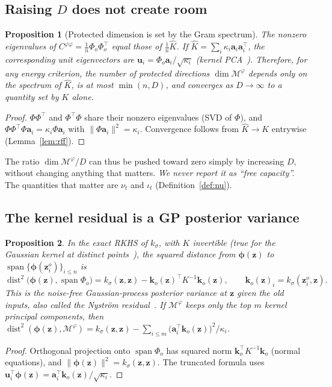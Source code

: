 \documentclass[11pt]{article}
\theoremstyle{plain}
\newtheorem{proposition}{Proposition}
\theoremstyle{definition}
\theoremstyle{remark}
\newcommand{\M}{\mathcal{M}}
\newcommand{\spn}{\operatorname{span}}
\newcommand{\dist}{\operatorname{dist}}
\newcommand{\z}{\bm{z}}
\newcommand{\vu}{\bm{u}}
\newcommand{\vphi}{\bm{\phi}}
\begin{document}
\subsection{Raising $D$ does not create room}
\begin{proposition}[Protected dimension is set by the Gram spectrum]\label{prop:Dindep}
The nonzero eigenvalues of $C^{\varphi\varphi}=\frac1n\Phi_o\Phi_o^{\top}$ equal those of $\frac1n\widehat K$. If $\widehat K=\sum_i\kappa_i\bm a_i\bm a_i^{\top}$, the corresponding unit eigenvectors are $\vu_i=\Phi_o\bm a_i/\sqrt{\kappa_i}$ (kernel PCA~\cite{kpca}). Therefore, for any energy criterion, the number of protected directions $\dim\M^\varphi$ depends only on the spectrum of $\widehat K$, is at most $\min(n,D)$, and converges as $D\to\infty$ to a quantity set by $K$ alone.
\end{proposition}
\begin{proof}
$\Phi\Phi^{\top}$ and $\Phi^{\top}\Phi$ share their nonzero eigenvalues (SVD of $\Phi$), and $\Phi\Phi^{\top}\Phi\bm a_i=\kappa_i\Phi\bm a_i$ with $\|\Phi\bm a_i\|^2=\kappa_i$. Convergence follows from $\widehat K\to K$ entrywise (Lemma~\ref{lem:rff}).
\end{proof}

The ratio $\dim\M^\varphi/D$ can thus be pushed toward zero simply by increasing $D$, without changing anything that matters. \emph{We never report it as ``free capacity''.} The quantities that matter are $\nu_t$ and $\iota_t$ (Definition~\ref{def:nu}).

\subsection{The kernel residual is a GP posterior variance}
\begin{proposition}\label{prop:gp}
In the exact RKHS of $k_\sigma$, with $K$ invertible (true for the Gaussian kernel at distinct points~\cite{micchelli}), the squared distance from $\vphi(\z)$ to $\spn\{\vphi(\z^o_i)\}_{i\le n}$ is
\begin{equation}\label{eq:gpvar}
\dist^2\big(\vphi(\z),\spn\Phi_o\big)=k_\sigma(\z,\z)-\bm k_o(\z)^{\top}K^{-1}\bm k_o(\z),\qquad \bm k_o(\z)_i=k_\sigma(\z^o_i,\z).
\end{equation}
This is the noise-free Gaussian-process posterior variance at $\z$ given the old inputs, also called the Nystr\"om residual~\cite{nystrom,gpml}. If $\M^\varphi$ keeps only the top $m$ kernel principal components, then
$\dist^2(\vphi(\z),\M^\varphi)=k_\sigma(\z,\z)-\sum_{i\le m}\big(\bm a_i^{\top}\bm k_o(\z)\big)^2/\kappa_i$.
\end{proposition}
\begin{proof}
Orthogonal projection onto $\spn\Phi_o$ has squared norm $\bm k_o^{\top}K^{-1}\bm k_o$ (normal equations), and $\|\vphi(\z)\|^2=k_\sigma(\z,\z)$. The truncated formula uses $\vu_i^{\top}\vphi(\z)=\bm a_i^{\top}\bm k_o(\z)/\sqrt{\kappa_i}$.
\end{proof}
\end{document}
